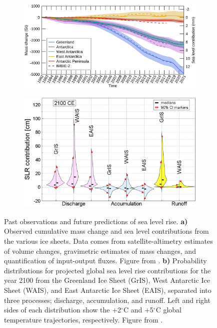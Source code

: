 \begin{figure}[!ht]
  \centering
    \begin{subfigure}[t]{.54\textwidth}
        \centering
        \includegraphics[width=\textwidth]{figures/chp1/Otosaka2023_mass_change.png}
        \caption{}
    \end{subfigure}
    \begin{subfigure}[t]{.44\textwidth}
        \centering
        \includegraphics[width=\textwidth]{figures/chp1/bamber2022_SLR_uncertainty.jpg}
        \caption{}
    \end{subfigure}
  \caption[Past observations and future predictions of sea level rise]{Past observations and future predictions of sea level rise.
  \textbf{a)} Observed cumulative mass change and sea level contributions from the various ice sheets. Data comes from satellite-altimetry estimates of volume changes, gravimetric estimates of mass changes, and quantification of input-output fluxes. Figure from \citet{otosakamass2023}.
  \textbf{b)} Probability distributions for projected global sea level rise contributions for the year 2100 from the Greenland Ice Sheet (GrIS), West Antarctic Ice Sheet (WAIS), and East Antarctic Ice Sheet (EAIS), separated into three processes; discharge, accumulation, and runoff. Left and right sides of each distribution show the +2$^{\circ}$C and +5$^{\circ}$C global temperature trajectories, respectively. Figure from \citet{bamberice2022}.}
    \label{fig:chp1_SLR}
\end{figure}

